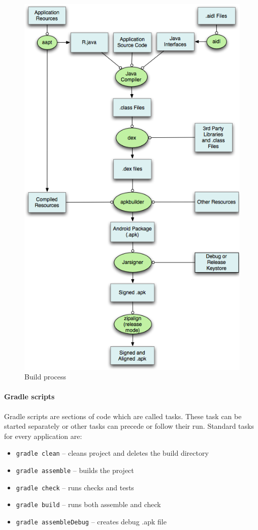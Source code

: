 \begin{figure}[h!]
    \centering
    \includegraphics[scale=0.45]{fig/build.png}
    \caption{Build process \cite{AndroidDev}}
\end{figure}

\paragraph{Gradle scripts}
Gradle scripts are sections of code which are called tasks. These task can be started separately or other tasks can
precede or follow their run. Standard tasks for every application are:
\begin{itemize}
  \item \texttt{gradle clean} -- cleans project and deletes the build directory
  \item \texttt{gradle assemble} -- builds the project
  \item \texttt{gradle check} -- runs checks and tests
  \item \texttt{gradle build} -- runs both assemble and check
  \item \texttt{gradle assembleDebug} -- creates debug .apk file
\end{itemize}
